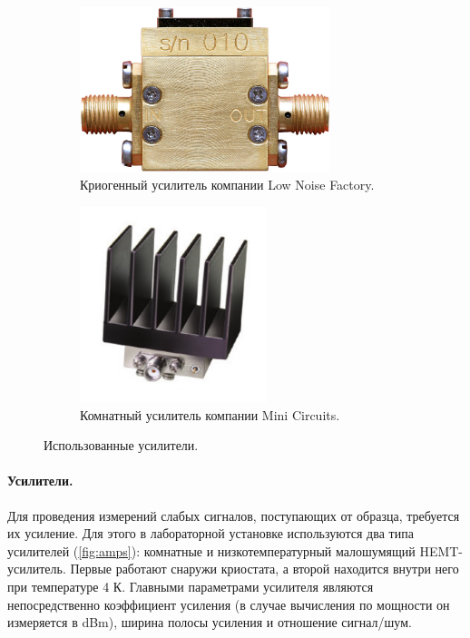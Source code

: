 \documentclass[12pt, twoside]{report}
\numberwithin{equation}{section}
\numberwithin{figure}{section}
\begin{document}
\begin{figure}
\centering
\begin{subfigure}[t]{0.35\textwidth}
	\centering
	\includegraphics[width=0.8\textwidth]{Pictures/cryoamp}
	\caption{Криогенный усилитель компании Low Noise Factory.}
\end{subfigure}

\begin{subfigure}[t]{0.35\textwidth}
	\centering
	\includegraphics[width=0.6\textwidth]{Pictures/amp}
	\caption{Комнатный усилитель компании Mini Circuits.}
\end{subfigure}
\caption{Использованные усилители.}
\label{fig:amps}
\end{figure}

\paragraph{Усилители.} Для проведения измерений слабых сигналов, поступающих от образца, требуется их усиление. Для этого в лабораторной установке используются два типа усилителей (\autoref{fig:amps}): комнатные и низкотемпературный малошумящий HEMT-усилитель. Первые работают снаружи криостата, а второй находится внутри него при температуре 4 К. Главными параметрами усилителя являются непосредственно коэффициент усиления (в случае вычисления по мощности он измеряется в dBm), ширина полосы усиления и отношение сигнал/шум. 
\end{document}
